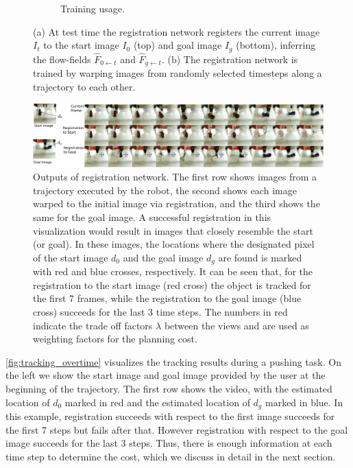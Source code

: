 \begin{figure}[t!]
\begin{subfigure}[b]{0.55\columnwidth}
        \caption{\small{Training usage.}}
        \label{fig:discrete}
    \end{subfigure}
    \vspace{-1mm}
    \caption{\small{(a) At test time the registration network registers the current image $I_t$ to the start image $I_0$ (top) and goal image $I_g$ (bottom), inferring the flow-fields $\hat{F}_{0 \leftarrow t}$ and $\hat{F}_{g \leftarrow t}$. (b) The registration network is trained by warping images from randomly selected timesteps along a trajectory to each other.
    }}
    \label{fig:registration_arch}
\end{figure}

\begin{figure}
    \centering
    \vspace{-0.1in}
    \includegraphics[width=1\linewidth]{images_rfr/registration_overtime.pdf}
    \caption{\small{Outputs of registration network. The first row shows images from a trajectory executed by the robot, the second shows each image warped to the initial image via registration, and the third shows the same for the goal image. A successful registration in this visualization would result in images that closely resemble the start (or goal). In these images, the locations where the designated pixel of the start image $d_0$ and the goal image $d_g$ are found is marked with red and blue crosses, respectively. It can be seen that, for the registration to the start image (red cross) the object is tracked for the first 7 frames, while the registration to the goal image (blue cross) succeeds for the last 3 time steps. The numbers in red indicate the trade off factors $\lambda$ between the views and are used as weighting factors for the planning cost.}}
    \label{fig:tracking_overtime}
    \vspace{-0.2in}
\end{figure}

\autoref{fig:tracking_overtime} visualizes the tracking results during a pushing task. On the left we show the start image and goal image provided by the user at the beginning of the trajectory. The first row shows the video, with the estimated location of $d_0$ marked in red and the estimated location of $d_g$ marked in blue. In this example, registration succeeds with respect to the first image succeeds for the first 7 steps but fails after that. However registration with respect to the goal image succeeds for the last 3 steps. Thus, there is enough information at each time step to determine the cost, which we discuss in detail in the next section.


